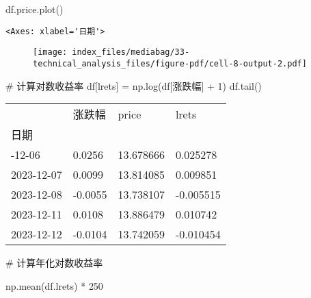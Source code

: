 \documentclass[
  letterpaper,
  DIV=11,
  numbers=noendperiod]{scrreprt}
\newenvironment{Shaded}{\begin{snugshade}}{\end{snugshade}}
\newcommand{\CommentTok}[1]{\textcolor[rgb]{0.37,0.37,0.37}{#1}}
\newcommand{\DecValTok}[1]{\textcolor[rgb]{0.68,0.00,0.00}{#1}}
\newcommand{\NormalTok}[1]{\textcolor[rgb]{0.00,0.23,0.31}{#1}}
\newcommand{\OperatorTok}[1]{\textcolor[rgb]{0.37,0.37,0.37}{#1}}
\newcommand{\StringTok}[1]{\textcolor[rgb]{0.13,0.47,0.30}{#1}}
\begin{document}
\begin{Shaded}
\begin{Highlighting}[]
\NormalTok{df.price.plot()}
\end{Highlighting}
\end{Shaded}

\begin{verbatim}
<Axes: xlabel='日期'>
\end{verbatim}

\begin{figure}[H]

{\centering \texttt{[image: index\_files/mediabag/33-technical\_analysis\_files/figure-pdf/cell-8-output-2.pdf]}

}

\end{figure}

\begin{Shaded}
\begin{Highlighting}[]
\CommentTok{\# 计算对数收益率}
\NormalTok{df[}\StringTok{\textquotesingle{}lrets\textquotesingle{}}\NormalTok{] }\OperatorTok{=}\NormalTok{ np.log(df[}\StringTok{\textquotesingle{}涨跌幅\textquotesingle{}}\NormalTok{] }\OperatorTok{+} \DecValTok{1}\NormalTok{)}
\NormalTok{df.tail()}
\end{Highlighting}
\end{Shaded}

\begin{longtable}[]{@{}llll@{}}
\toprule\noalign{}
& 涨跌幅 & price & lrets \\
日期 & & & \\
\midrule\noalign{}
\endhead
\bottomrule\noalign{}
\endlastfoot
2023-12-06 & 0.0256 & 13.678666 & 0.025278 \\
2023-12-07 & 0.0099 & 13.814085 & 0.009851 \\
2023-12-08 & -0.0055 & 13.738107 & -0.005515 \\
2023-12-11 & 0.0108 & 13.886479 & 0.010742 \\
2023-12-12 & -0.0104 & 13.742059 & -0.010454 \\
\end{longtable}

\begin{Shaded}
\begin{Highlighting}[]
\CommentTok{\# 计算年化对数收益率}

\NormalTok{np.mean(df.lrets) }\OperatorTok{*} \DecValTok{250}
\end{Highlighting}
\end{Shaded}
\end{document}
